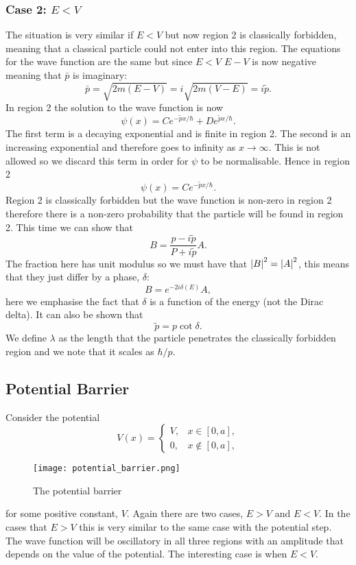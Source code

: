     \subsubsection{Case 2: \texorpdfstring{\(E < V\)}{E<V}}
    The situation is very similar if \(E < V\) but now region 2 is classically forbidden, meaning that a classical particle could not enter into this region.
    The equations for the wave function are the same but since \(E < V\) \(E - V\) is now negative meaning that \(\bar{p}\) is imaginary:
    \[\bar{p} = \sqrt{2m(E - V)} = i\sqrt{2m(V -  E)} = i\tilde{p}.\]
    In region 2 the solution to the wave function is now
    \[\psi(x) = Ce^{-\tilde{p}x/\hbar} + De^{\tilde{p}x/\hbar}.\]
    The first term is a decaying exponential and is finite in region 2.
    The second is an increasing exponential and therefore goes to infinity as \(x \to\infty\).
    This is not allowed so we discard this term in order for \(\psi\) to be normalisable.
    Hence in region 2
    \[\psi(x) = Ce^{-\tilde{p}x/\hbar}.\]
    Region 2 is classically forbidden but the wave function is non-zero in region 2 therefore there is a non-zero probability that the particle will be found in region 2.
    This time we can show that
    \[B = \frac{p - i\tilde{p}}{P + i\tilde{p}}A.\]
    The fraction here has unit modulus so we must have that \(\abs{B}^2 = \abs{A}^2\), this means that they just differ by a phase, \(\delta\):
    \[B = e^{-2i\delta(E)}A,\]
    here we emphasise the fact that \(\delta\) is a function of the energy (not the Dirac delta).
    It can also be shown that
    \[\tilde{p} = p\cot\delta.\]
    We define \(\lambda\) as the length that the particle penetrates the classically forbidden region and we note that it scales as \(\hbar/p\).
    
    \subsection{Potential Barrier}
    Consider the potential
    \[
        V(x) = 
        \begin{cases}
            V, & x \in [0, a],\\
            0, & x\notin[0, a],
        \end{cases}
    \]
    \begin{figure}[ht]
        \centering
        \texttt{[image: potential\_barrier.png]}
        \caption{The potential barrier}
    \end{figure}
    for some positive constant, \(V\).
    Again there are two cases, \(E > V\) and \(E < V\).
    In the cases that \(E > V\) this is very similar to the same case with the potential step.
    The wave function will be oscillatory in all three regions with an amplitude that depends on the value of the potential.
    The interesting case is when \(E < V\).
    
